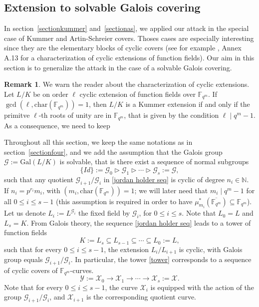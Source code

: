 \documentclass[10pt]{article}
\theoremstyle{definition}
\newtheorem{rq1}[thm]{Remark}
\theoremstyle{definition}
\theoremstyle{definition}
\newcommand{\s}{\vspace{0.3cm}}
\newcommand{\N}{\mathbb{N}}
\newcommand{\fqm}{\mathbb{F}_{q^m}}
\newcommand{\su}{\subseteq}
\newcommand{\X}{\mathcal{X}}
\newcommand{\Y}{\mathcal{Y}}
\newcommand{\G}{\mathcal{G}}
\begin{document}
\s


\subsection{Extension to solvable Galois covering}

\s

In section~\ref{sectionkummer} and~\ref{sectionas}, we applied our attack in the special case of Kummer and Artin-Schreier covers. Thoses cases are especially interesting since they are the elementary blocks of cyclic covers (see for example \cite{Sti}, Annex A.13 for a characterization of cyclic extensions of function fields). Our aim in this section is to generalize the attack in the case of a solvable Galois covering.

\s

\color{purple}
\begin{rq1} \label{racinesdel'unite}
We warn the reader about the characterization of cyclic extensions. 
Let $L/K$ be on order $\ell$ cyclic extension of function fields over $\fqm$. If $\gcd(\ell,\mathrm{char}(\fqm))=1$, then $L/K$ is a Kummer extension if and only if the primitve $\ell$-th roots of unity are in $\fqm$, that is given by the condition $\ell \mid q^m-1$. As a consequence, we need to keep  
\end{rq1}

\s

Throughout all this section, we keep the same notations as in section~\ref{sectionfour}, and we add the assumption that the Galois group $\G := \mathrm{Gal}(L/K)$ is solvable,  \color{black} that is there exist a sequence of normal subgroups 
\begin{equation} \label{jordan holder seq}
 \{Id\} := \G_0 \triangleright \G_1 \triangleright \cdots \triangleright \G_s := \G, 
\end{equation} 
such that any quotient $\G_{i+1}/\G_i$ in \eqref{jordan holder seq} is cyclic \color{purple} of degree $n_i \in \N$. If $n_i = p^{r_i}m_i$, with $(m_i,\mathrm{char}(\fqm))=1$; we will later need that $m_i \mid q^m-1$ for all $0\leq i\leq s-1$ (this assumption is required in order to have $\mu_{m_i}^*(\overline{\fqm}) \su \fqm$)\color{black}. \\
 Let us denote $L_i := L^{\G_i}$ the fixed field by $\G_i$, for $0 \leq i \leq s$. Note that $L_0=L$ and $L_s=K$. From Galois theory, the sequence \eqref{jordan holder seq} leads to a tower of function fields
\begin{equation} \label{tower}
K := L_s \su L_{s-1} \su \cdots \su L_0 := L,
\end{equation}
such that for every $0\leq i\leq s-1$, the extension $L_i/L_{i+1}$ is cyclic, with Galois group equals $\G_{i+1}/\G_i$. In particular, the tower \eqref{tower} corresponds to a sequence of cyclic covers of $\fqm$-curves.
\begin{equation} \label{curve tower}
\Y := \X_0 \longrightarrow \X_1 \longrightarrow \cdots \longrightarrow \X_s := \X.
\end{equation}
Note that for every $0 \leq i \leq s-1$, the curve $\X_i$ is equipped with the action of the group $\G_{i+1}/\G_i$, and $\X_{i+1}$ is the corresponding quotient curve. 
\end{document}
